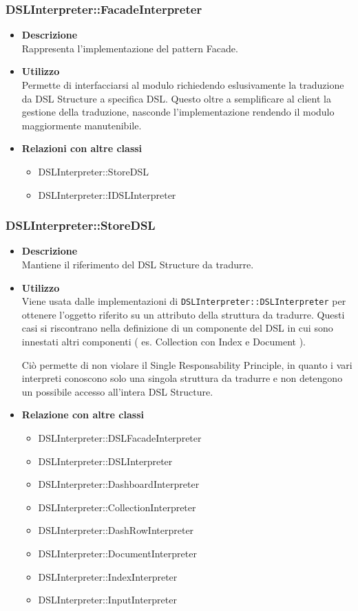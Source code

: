 \subsubsection{DSLInterpreter::FacadeInterpreter}
\begin{itemize}
\item \textbf{Descrizione} \hfill \\
  Rappresenta l'implementazione del pattern Facade.
\item \textbf{Utilizzo} \hfill \\
  Permette di interfacciarsi al modulo richiedendo eslusivamente la traduzione da DSL Structure a specifica DSL. Questo oltre a semplificare al client la gestione della traduzione, nasconde l'implementazione rendendo il modulo maggiormente manutenibile.
\item \textbf{Relazioni con altre classi} \hfill
  \begin{itemize}
  \item DSLInterpreter::StoreDSL
  \item DSLInterpreter::IDSLInterpreter
  \end{itemize}
\end{itemize}
\subsubsection{DSLInterpreter::StoreDSL}
\begin{itemize}
\item \textbf{Descrizione} \hfill \\
  Mantiene il riferimento del DSL Structure da tradurre.
\item \textbf{Utilizzo} \hfill \\
  Viene usata dalle implementazioni di \texttt{DSLInterpreter::DSLInterpreter} per ottenere l'oggetto riferito su un attributo della struttura da tradurre. Questi casi si riscontrano nella definizione di un componente del DSL in cui sono innestati altri componenti ( es. Collection con Index e Document ).

  Ciò permette di non violare il Single Responsability Principle, in quanto i vari interpreti conoscono solo una singola struttura da tradurre e non detengono un possibile accesso all'intera DSL Structure.
\item \textbf{Relazione con altre classi} \hfill
  \begin{itemize}
  \item DSLInterpreter::DSLFacadeInterpreter
  \item DSLInterpreter::DSLInterpreter
  \item DSLInterpreter::DashboardInterpreter
  \item DSLInterpreter::CollectionInterpreter
  \item DSLInterpreter::DashRowInterpreter
  \item DSLInterpreter::DocumentInterpreter
  \item DSLInterpreter::IndexInterpreter
  \item DSLInterpreter::InputInterpreter
  \end{itemize}
\end{itemize}

